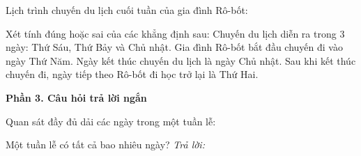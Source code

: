 \begin{ex} %
Lịch trình chuyến du lịch cuối tuần của gia đình Rô-bốt:
\begin{center}\vspace{-2.5mm}
\vspace{-2.5mm}\end{center}
Xét tính đúng hoặc sai của các khẳng định sau:
\choiceTF
{\True Chuyến du lịch diễn ra trong $3$ ngày: Thứ Sáu, Thứ Bảy và Chủ nhật.}
{Gia đình Rô-bốt bắt đầu chuyến đi vào ngày Thứ Năm.}
{\True Ngày kết thúc chuyến du lịch là ngày Chủ nhật.}
{\True Sau khi kết thúc chuyến đi, ngày tiếp theo Rô-bốt đi học trở lại là Thứ Hai.}
\end{ex}

\newpage

\textbf{Phần 3. Câu hỏi trả lời ngắn}

\begin{ex} %
Quan sát đầy đủ dải các ngày trong một tuần lễ:
\begin{center}\vspace{-2.5mm}
\vspace{-2.5mm}\end{center}
Một tuần lễ có tất cả bao nhiêu ngày?
\textit{Trả lời:} 
\end{ex}

